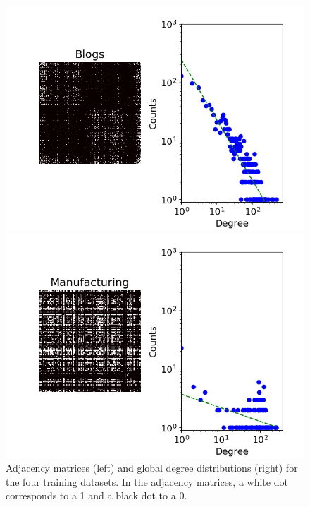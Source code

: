 \documentclass[conference]{IEEEtran}
\begin{document}
\begin{figure}[ht!]
\begin{minipage}{0.4\textwidth}
            \includegraphics[width=\textwidth]{img/corpus/blogs_dd}
        \end{minipage}
        \begin{minipage}{0.4\textwidth}
            \includegraphics[width=\textwidth]{img/corpus/manufacturing_dd}
        \end{minipage}
	\caption{Adjacency matrices (left) and global degree distributions (right) for the four training datasets. In the adjacency matrices, a white dot corresponds to a 1 and a black dot to a 0.}
	\label{fig:corpuses}
\end{figure}
\end{document}
